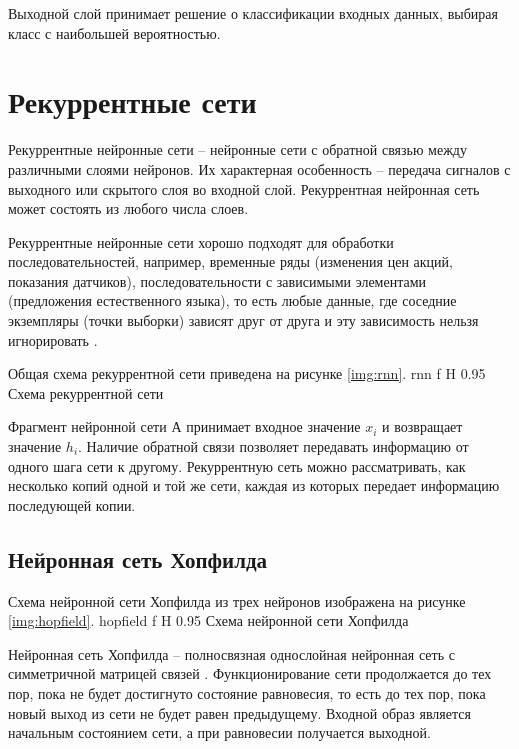 Выходной слой принимает решение о классификации входных данных, выбирая класс с наибольшей вероятностью.

\section{Рекуррентные сети}
Рекуррентные нейронные сети -- нейронные сети с обратной связью между различными слоями нейронов.
Их характерная особенность -- передача сигналов с выходного или скрытого слоя во входной слой.
Рекуррентная нейронная сеть может состоять из любого числа слоев.

Рекуррентные нейронные сети хорошо подходят для обработки последовательностей, например, временные ряды (изменения цен акций, показания датчиков), последовательности с зависимыми элементами (предложения естественного языка), то есть любые данные, где соседние экземпляры (точки выборки) зависят друг от друга и эту зависимость нельзя игнорировать \cite{дель2021прогноз}.

Общая схема рекуррентной сети приведена на рисунке \ref{img:rnn}.
{rnn} %
{f} %
{H} %
{0.95\textwidth} %
{Схема рекуррентной сети} %

Фрагмент нейронной сети А принимает входное значение $x_i$ и возвращает значение $h_i$. 
Наличие обратной связи позволяет передавать информацию от одного шага сети к другому. 
Рекуррентную сеть можно рассматривать, как несколько копий одной и той же сети, каждая из которых передает информацию последующей копии.

\subsection{Нейронная сеть Хопфилда}
Схема нейронной сети Хопфилда из трех нейронов изображена на рисунке \ref{img:hopfield}.
{hopfield} %
{f} %
{H} %
{0.95\textwidth} %
{Схема нейронной сети Хопфилда} %

Нейронная сеть Хопфилда -- полносвязная однослойная нейронная сеть с симметричной матрицей связей \cite{ромасенко2022запоминание}.
Функционирование сети продолжается до тех пор, пока не будет достигнуто состояние равновесия, то есть до тех пор, пока новый выход из сети не будет равен предыдущему.
Входной образ является начальным состоянием сети, а при равновесии получается выходной.

